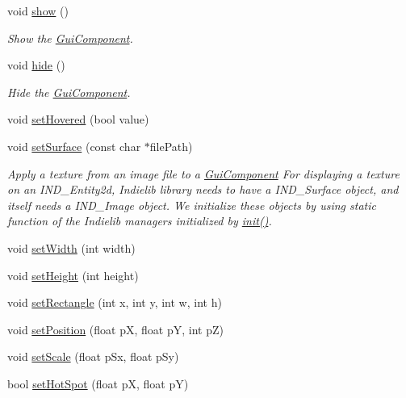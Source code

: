 \begin{DoxyCompactItemize}
void \hyperlink{class_symp_1_1_gui_component_a34211085d9f971ef3a4e117b0603acf3}{show} ()
\begin{DoxyCompactList}\small\item\em Show the \hyperlink{class_symp_1_1_gui_component}{Gui\-Component}. \end{DoxyCompactList}\item 
void \hyperlink{class_symp_1_1_gui_component_a8fc95fe5807ba8b1afa599db48771c0d}{hide} ()
\begin{DoxyCompactList}\small\item\em Hide the \hyperlink{class_symp_1_1_gui_component}{Gui\-Component}. \end{DoxyCompactList}\item 
void \hyperlink{class_symp_1_1_gui_component_aac319b767afa5a945208c704d3d640ed}{set\-Hovered} (bool value)
\item 
void \hyperlink{class_symp_1_1_gui_component_ab6a2f0f5f43de649f1e50d601518bf1e}{set\-Surface} (const char $\ast$file\-Path)
\begin{DoxyCompactList}\small\item\em Apply a texture from an image file to a \hyperlink{class_symp_1_1_gui_component_a22124675c2976983ac18374f81cc3fb3}{Gui\-Component} For displaying a texture on an I\-N\-D\-\_\-\-Entity2d, Indielib library needs to have a I\-N\-D\-\_\-\-Surface object, and itself needs a I\-N\-D\-\_\-\-Image object. We initialize these objects by using static function of the Indielib managers initialized by \hyperlink{class_symp_1_1_gui_component_a05838e01bbf1e31f292ed4b92a520f20}{init()}. \end{DoxyCompactList}\item 
void \hyperlink{class_symp_1_1_gui_component_a35b54d009eeb7cf4790ca6f33f2d3906}{set\-Width} (int width)
\item 
void \hyperlink{class_symp_1_1_gui_component_a142f827392864e64b77ad02e05575f97}{set\-Height} (int height)
\item 
void \hyperlink{class_symp_1_1_gui_component_a56ec60b13aaf72bee8c3212d89986076}{set\-Rectangle} (int x, int y, int w, int h)
\item 
void \hyperlink{class_symp_1_1_gui_component_ae0939017b02f2aad37375ca2bb25f758}{set\-Position} (float p\-X, float p\-Y, int p\-Z)
\item 
void \hyperlink{class_symp_1_1_gui_component_a71b9ec5dbeb56658e12dc5d3872c5625}{set\-Scale} (float p\-Sx, float p\-Sy)
\item 
bool \hyperlink{class_symp_1_1_gui_component_acdbda4c1c82e319b7b0de755355216a0}{set\-Hot\-Spot} (float p\-X, float p\-Y)
\end{DoxyCompactItemize}

